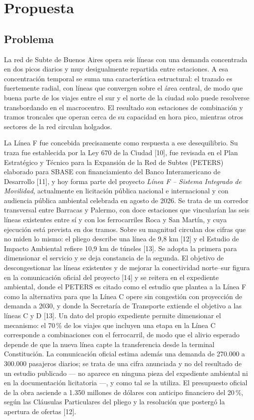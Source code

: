 \documentclass{article}
\begin{document}
\section{Propuesta}

\subsection{Problema}

La red de Subte de Buenos Aires opera seis líneas con una demanda concentrada en dos picos diarios y muy
desigualmente repartida entre estaciones. A esa concentración temporal se suma una característica
estructural: el trazado es fuertemente radial, con líneas que convergen sobre el área central, de modo que
buena parte de los viajes entre el sur y el norte de la ciudad solo puede resolverse transbordando en el
macrocentro. El resultado son estaciones de combinación y tramos troncales que operan cerca de su
capacidad en hora pico, mientras otros sectores de la red circulan holgados.

La Línea F fue concebida precisamente como respuesta a ese desequilibrio. Su traza fue establecida por la
Ley 670 de la Ciudad [10], fue revisada en el Plan Estratégico y Técnico para la Expansión de la Red de
Subtes (PETERS) elaborado para SBASE con financiamiento del Banco Interamericano de Desarrollo [11], y hoy
forma parte
del proyecto \textit{Línea F -- Sistema Integrado de Movilidad}, actualmente en licitación pública nacional
e internacional y con audiencia pública ambiental celebrada en agosto de 2026. Se trata de un corredor
transversal entre Barracas y Palermo, con doce estaciones que vincularían las seis líneas existentes entre
sí y con los ferrocarriles Roca y San Martín, y cuya ejecución está prevista en dos tramos. Sobre su
magnitud circulan dos cifras que no miden lo mismo: el pliego describe una línea de 9,8 km [12] y el Estudio
de Impacto Ambiental refiere 10,9 km de túneles [13]. Se adopta la primera para dimensionar el servicio y se
deja constancia de la segunda. El objetivo de descongestionar las líneas existentes y de mejorar la
conectividad norte--sur figura en la comunicación oficial del proyecto [14] y se reitera en el expediente
ambiental, donde el PETERS es citado como el estudio que plantea a la Línea F como la alternativa para que
la Línea C opere sin congestión con proyección de demanda a 2030, y donde la Secretaría de Transporte
extiende el objetivo a las líneas C y D [13]. Un dato del propio expediente permite dimensionar el
mecanismo: el 70\,\% de los viajes que incluyen una etapa en la Línea C corresponde a combinaciones con el
ferrocarril, de modo que el alivio esperado depende de que la nueva línea capte la transferencia desde la
terminal Constitución. La comunicación oficial estima además una demanda de 270.000 a 300.000 pasajeros
diarios; se trata de una cifra anunciada y no del resultado de un estudio publicado --- no aparece en
ninguna pieza del expediente ambiental ni en la documentación licitatoria ---, y como tal se la utiliza. El
presupuesto oficial de la obra asciende a 1.350 millones de dólares con anticipo financiero del 20\,\%, según
las Cláusulas Particulares del pliego y la resolución que postergó la apertura de ofertas [12].
\end{document}
